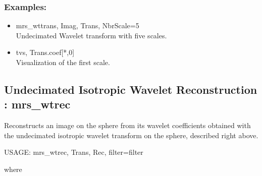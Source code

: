 \subsubsection*{Examples:} 
\begin{itemize}
\item mrs\_wttrans, Imag, Trans, NbrScale=5 \\
Undecimated Wavelet transform with five scales.
\item tvs, Trans.coef[*,0]  \\
Visualization of the first scale.
\end{itemize}


\subsection{Undecimated Isotropic Wavelet Reconstruction : mrs\_wtrec}
Reconstructs an image on the sphere from its wavelet coefficients obtained with the undecimated isotropic wavelet transform on the sphere, described right above.
{\bf
\begin{center}
     USAGE: mrs\_wtrec, Trans, Rec, filter=filter 
\end{center}}
where 
